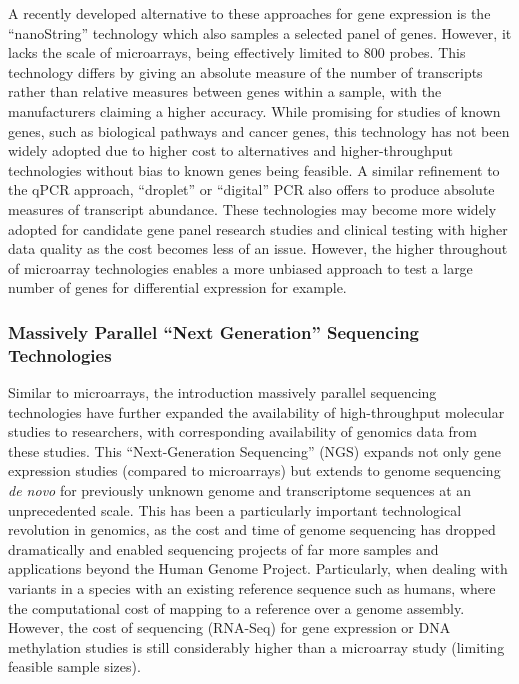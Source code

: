 A recently developed alternative to these approaches for gene expression is the ``nanoString'' technology which also samples a selected panel of genes. However, it lacks the scale of microarrays, being effectively limited to 800 probes. This technology differs by giving an absolute measure of the number of transcripts rather than relative measures between genes within a sample, with the manufacturers claiming a higher accuracy. While promising for studies of known genes, such as biological pathways and cancer genes, this technology has not been widely adopted due to higher cost to alternatives and higher-throughput technologies without bias to known genes being feasible. A similar refinement to the qPCR approach, ``droplet'' or ``digital'' PCR also offers to produce absolute measures of transcript abundance. These technologies may become more widely adopted for candidate gene panel research studies and clinical testing with higher data quality as the cost becomes less of an issue. However, the higher throughout of microarray technologies enables a more unbiased approach to test a large number of genes for differential expression for example.

\subsubsection{Massively Parallel ``Next Generation'' Sequencing Technologies}
Similar to microarrays, the introduction massively parallel sequencing technologies have further expanded the availability of high-throughput molecular studies to researchers, with corresponding availability of genomics data from these studies. This ``Next-Generation Sequencing'' (NGS) expands not only gene expression studies (compared to microarrays) but extends to genome sequencing \textit{de novo} for previously unknown genome and transcriptome sequences at an unprecedented scale. This has been a particularly important technological revolution in genomics, as the cost and time of genome sequencing has dropped dramatically and enabled sequencing projects of far more samples and applications beyond the Human Genome Project. Particularly, when dealing with variants in a species with an existing reference sequence such as humans, where the computational cost of mapping to a reference over a genome assembly. However, the cost of sequencing (RNA-Seq) for gene expression or DNA methylation studies is still considerably higher than a microarray study (limiting feasible sample sizes).


